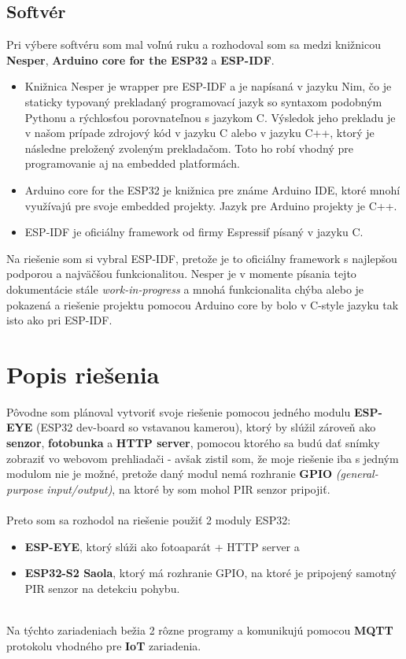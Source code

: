 \documentclass[a4paper,12pt]{article}
\begin{document}
\subsection{Softvér}
Pri výbere softvéru som mal voľnú ruku a rozhodoval som sa medzi knižnicou \textbf{Nesper}, \textbf{Arduino core for the ESP32} a \textbf{ESP-IDF}.
\begin{itemize}
  \item Knižnica Nesper je wrapper pre ESP-IDF a je napísaná v jazyku Nim, čo je staticky typovaný prekladaný programovací jazyk so syntaxom podobným Pythonu a rýchlosťou porovnateľnou s jazykom C.
Výsledok jeho prekladu je v našom prípade zdrojový kód v jazyku C alebo v jazyku C++, ktorý je následne preložený zvoleným prekladačom. Toto ho robí vhodný pre programovanie aj na embedded platformách.
\item  Arduino core for the ESP32 je knižnica pre známe Arduino IDE, ktoré mnohí využívajú pre svoje embedded projekty. Jazyk pre Arduino projekty je C++.
\item  ESP-IDF je oficiálny framework od firmy Espressif písaný v jazyku C.
\end{itemize}
Na riešenie som si vybral ESP-IDF, pretože je to oficiálny framework s najlepšou podporou a najväčšou funkcionalitou. Nesper je v momente písania tejto dokumentácie stále \textit{work-in-progress} a mnohá funkcionalita chýba alebo je pokazená a riešenie projektu pomocou Arduino core
by bolo v C-style jazyku tak isto ako pri ESP-IDF.

\newpage
\section{Popis riešenia}
Pôvodne som plánoval vytvoriť svoje riešenie pomocou jedného modulu \textbf{ESP-EYE} (ESP32 dev-board so vstavanou kamerou), ktorý by slúžil zároveň ako \textbf{senzor}, \textbf{fotobunka} a \textbf{HTTP server}, 
pomocou ktorého sa budú dať snímky zobraziť vo webovom prehliadači - avšak zistil som,
že moje riešenie iba s jedným modulom nie je možné, pretože daný modul nemá rozhranie \textbf{GPIO} \textit{(general-purpose input/output)}, na ktoré by som mohol PIR senzor pripojiť.
\\
\\
Preto som sa rozhodol na riešenie použiť 2 moduly ESP32:
\begin{itemize}
  \item \textbf{ESP-EYE}, ktorý slúži ako fotoaparát + HTTP server a
  \item \textbf{ESP32-S2 Saola}, ktorý má rozhranie GPIO, na ktoré je pripojený samotný PIR senzor na detekciu pohybu.
\end{itemize}
\\
Na týchto zariadeniach bežia 2 rôzne programy a komunikujú pomocou \textbf{MQTT} protokolu vhodného pre \textbf{IoT} zariadenia.
\end{document}
